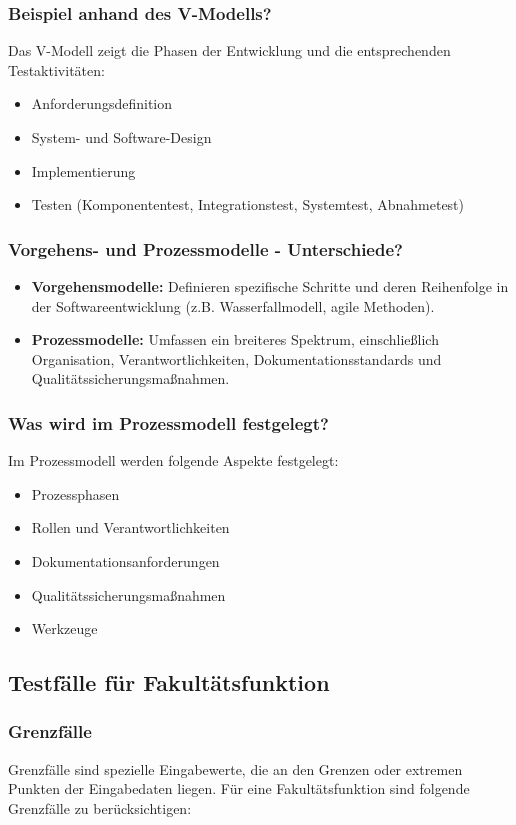 \documentclass[main.tex]{subfiles}
\begin{document}
\subsubsection*{Beispiel anhand des V-Modells?}
Das V-Modell zeigt die Phasen der Entwicklung und die entsprechenden Testaktivitäten:
\begin{itemize}
    \item Anforderungsdefinition
    \item System- und Software-Design
    \item Implementierung
    \item Testen (Komponententest, Integrationstest, Systemtest, Abnahmetest)
\end{itemize}


\subsubsection*{Vorgehens- und Prozessmodelle - Unterschiede?}
\begin{itemize}
    \item \textbf{Vorgehensmodelle:} Definieren spezifische Schritte und deren Reihenfolge in der Softwareentwicklung (z.B. Wasserfallmodell, agile Methoden).
    \item \textbf{Prozessmodelle:} Umfassen ein breiteres Spektrum, einschließlich Organisation, Verantwortlichkeiten, Dokumentationsstandards und Qualitätssicherungsmaßnahmen.
\end{itemize}

\subsubsection*{Was wird im Prozessmodell festgelegt?}
Im Prozessmodell werden folgende Aspekte festgelegt:
\begin{itemize}
    \item Prozessphasen
    \item Rollen und Verantwortlichkeiten
    \item Dokumentationsanforderungen
    \item Qualitätssicherungsmaßnahmen
    \item Werkzeuge
\end{itemize}


\subsection{Testfälle für Fakultätsfunktion}
\subsubsection*{Grenzfälle} %
Grenzfälle sind spezielle Eingabewerte, die an den Grenzen oder extremen Punkten der Eingabedaten liegen. Für eine Fakultätsfunktion sind folgende Grenzfälle zu berücksichtigen:
 
\end{document}
